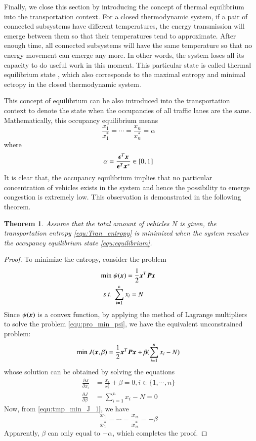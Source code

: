 \documentclass[preprint,authoryear,12pt]{elsarticle}
\renewcommand{\vec}[1]{\mbox{\boldmath$#1$}}
\newcommand{\mat}[1]{\mbox{\boldmath$#1$}}
\newtheorem{thm}{Theorem}
\begin{document}
Finally, we close this section by introducing the concept of thermal
equilibrium into the transportation context. For a closed
thermodynamic system, if a pair of connected subsystems have
different temperatures, the energy transmission will emerge between
them so that their temperatures tend to approximate. After enough
time, all connected subsystems will have the same temperature so that
no energy movement can emerge any more. In other words, the system
loses all its capacity to do useful work in this moment. This
particular state is called thermal equilibrium state
\citep{cengel_thermodynamics:_2001}, which also corresponds to the
maximal entropy and minimal ectropy in the closed thermodynamic
system.

This concept of equilibrium can be also introduced into the
transportation context to denote the state when the occupancies of
all traffic lanes are the same. Mathematically, this occupancy
equilibrium means
\begin{equation}\label{equ:equilibrium}
\frac{x_1}{x_1^*}=\cdots=\frac{x_n}{x_n^*}=\alpha
\end{equation}
where
$$\alpha = \frac{\vec{\epsilon}^T\vec{x}}{\vec{\epsilon}^T\vec{x}^*}\in[0,1]$$
It is clear that, the occupancy equilibrium implies that no
particular concentration of vehicles exists in the system and hence
the possibility to emerge congestion is extremely low. This
observation is demonstrated in the following theorem.

\begin{thm}\label{thm:entropy_equilibrium}
Assume that the total amount of vehicles $N$ is given, the
transportation entropy \eqref{equ:Tran_entropy} is minimized when the
system reaches the occupancy equilibrium state
\eqref{equ:equilibrium}.
\end{thm}
\begin{proof}
To minimize the entropy, consider the problem
\begin{align}\label{equ:pro_min_psi}
\min\; &\psi(\vec{x}) = \frac{1}{2}\vec{x}^T\mat{P}\vec{x}\\
s.t.\; &\sum_{i=1}^n x_i = N \nonumber
\end{align}
Since $\psi(\vec{x})$ is a convex function, by applying the method of
Lagrange multipliers to solve the problem \eqref{equ:pro_min_psi}, we
have the equivalent unconstrained problem:
$$\min J(\vec{x},\beta) = \frac{1}{2}\vec{x}^T\mat{P}\vec{x}+\beta(\sum_{i=1}^n x_i - N)$$
whose solution can be obtained by solving the equations
\begin{align}
\label{equ:tmp_min_J_1}
\frac{\partial J}{\partial x_i} &= \frac{x_i}{x_i^*}+\beta =0,
i\in\{1,\cdots,n\}\\
\label{equ:tmp_min_J_2}
\frac{\partial J}{\partial \beta} &= \sum_{i=1}^n x_i - N =0
\end{align}
Now, from \eqref{equ:tmp_min_J_1}, we have
$$\frac{x_1}{x_1^*}=\cdots=\frac{x_n}{x_n^*}=-\beta$$
Apparently, $\beta$ can only equal to $-\alpha$, which completes the
proof.
\end{proof}
\end{document}
